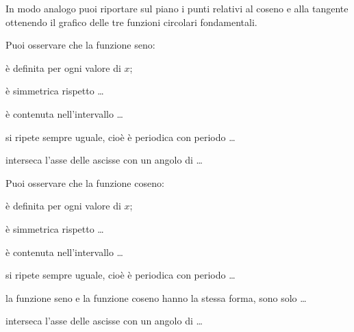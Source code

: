 In modo analogo puoi riportare sul piano i punti relativi al coseno e alla 
tangente ottenendo il grafico delle tre funzioni circolari fondamentali.

 \vspace{-6pt}
  \begin{center}
\begin{inaccessibleblock}
%     
\end{inaccessibleblock}
  \end{center}
Puoi osservare che la funzione seno:
\begin{itemize*}
 \item è definita per ogni valore di \(x\);
 \item è simmetrica rispetto \dots
 \item è contenuta nell'intervallo \dots
 \item si ripete sempre uguale, cioè è periodica con periodo \dots
 \item interseca l'asse delle ascisse con un angolo di \dots
\end{itemize*}
 \vspace{-6pt}
  \begin{center}
  
\begin{inaccessibleblock}
%     
\end{inaccessibleblock}
  \end{center}
Puoi osservare che la funzione coseno:
\begin{itemize*}
 \item è definita per ogni valore di \(x\);
 \item è simmetrica rispetto \dots
 \item è contenuta nell'intervallo \dots
 \item si ripete sempre uguale, cioè è periodica con periodo \dots
 \item la funzione seno e la funzione coseno hanno la stessa forma,
  sono solo \dots
 \item interseca l'asse delle ascisse con un angolo di \dots
\end{itemize*}

